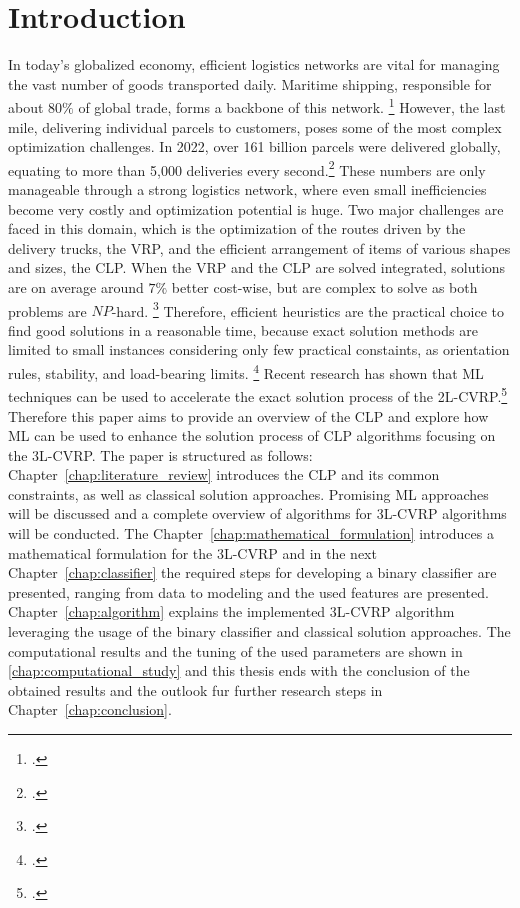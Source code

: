 \chapter{Introduction}
\label{sec:introduction}
In today’s globalized economy, efficient logistics networks are vital for managing the vast number of
goods transported daily. Maritime shipping, responsible for about $80\%$ of global trade,
forms a backbone of this network. \footcite[cf.][]{un_trade_and_development_unctad_review_2024}
However, the last mile, delivering individual parcels to customers, poses some of the most complex optimization
challenges. In 2022, over 161 billion parcels were delivered globally, equating to more than 5,000
deliveries every second.\footcite[cf.][]{statista_global_2022}
These numbers are only manageable through a strong logistics network, where even small inefficiencies
become very costly and optimization potential is huge. Two major challenges are faced in this domain, which
is the optimization of the routes driven by the delivery trucks, the \gls{VRP}, and the efficient arrangement of items
of various shapes and sizes, the \gls{CLP}. When the \gls{VRP} and the \gls{CLP} are solved integrated,
solutions are on average around $7\%$ better cost-wise, but are complex to solve as
both problems are $NP$-hard. \footcite[cf.][p. 23]{cote_value_2016} Therefore, efficient heuristics are the practical
choice to find good solutions in a reasonable time, because exact solution methods are limited to
small instances considering only few practical constaints, as orientation rules, stability, and load-bearing limits. \footcite[cf.][pp. 377--378]{bischoff_issues_1995}
Recent research has shown that \gls{ML} techniques can be used to accelerate the exact solution process
of the \gls{2L-CVRP}.\footcite[cf.][]{zhang_learning-based_2022}
Therefore this paper aims to provide an overview of the \gls{CLP} and explore how \gls{ML} can be used
to enhance the solution process of \gls{CLP} algorithms focusing on the \gls{3L-CVRP}.
The paper is structured as follows:
Chapter~\ref{chap:literature_review} introduces the \gls{CLP} and its common constraints, as well as classical
solution approaches. Promising \gls{ML} approaches will be discussed and a complete overview of algorithms
for \gls{3L-CVRP} algorithms will be conducted. The Chapter~\ref{chap:mathematical_formulation} introduces
a mathematical formulation for the \gls{3L-CVRP} and in the next Chapter~\ref{chap:classifier} the required
steps for developing a binary classifier are presented, ranging from data to modeling and the used features
are presented. Chapter~\ref{chap:algorithm} explains the implemented \gls{3L-CVRP} algorithm leveraging
the usage of the binary classifier and classical solution approaches. The computational results and the
tuning of the used parameters are shown in \ref{chap:computational_study} and this thesis ends with the conclusion
of the obtained results and the outlook fur further research steps in Chapter~\ref{chap:conclusion}.
